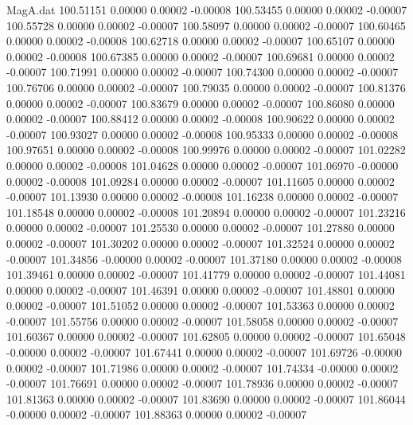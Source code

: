 \begin{filecontents}{MagA.dat}
 100.51151    0.00000    0.00002   -0.00008
 100.53455    0.00000    0.00002   -0.00007
 100.55728    0.00000    0.00002   -0.00007
 100.58097    0.00000    0.00002   -0.00007
 100.60465    0.00000    0.00002   -0.00008
 100.62718    0.00000    0.00002   -0.00007
 100.65107    0.00000    0.00002   -0.00008
 100.67385    0.00000    0.00002   -0.00007
 100.69681    0.00000    0.00002   -0.00007
 100.71991    0.00000    0.00002   -0.00007
 100.74300    0.00000    0.00002   -0.00007
 100.76706    0.00000    0.00002   -0.00007
 100.79035    0.00000    0.00002   -0.00007
 100.81376    0.00000    0.00002   -0.00007
 100.83679    0.00000    0.00002   -0.00007
 100.86080    0.00000    0.00002   -0.00007
 100.88412    0.00000    0.00002   -0.00008
 100.90622    0.00000    0.00002   -0.00007
 100.93027    0.00000    0.00002   -0.00008
 100.95333    0.00000    0.00002   -0.00008
 100.97651    0.00000    0.00002   -0.00008
 100.99976    0.00000    0.00002   -0.00007
 101.02282    0.00000    0.00002   -0.00008
 101.04628    0.00000    0.00002   -0.00007
 101.06970   -0.00000    0.00002   -0.00008
 101.09284    0.00000    0.00002   -0.00007
 101.11605    0.00000    0.00002   -0.00007
 101.13930    0.00000    0.00002   -0.00008
 101.16238    0.00000    0.00002   -0.00007
 101.18548    0.00000    0.00002   -0.00008
 101.20894    0.00000    0.00002   -0.00007
 101.23216    0.00000    0.00002   -0.00007
 101.25530    0.00000    0.00002   -0.00007
 101.27880    0.00000    0.00002   -0.00007
 101.30202    0.00000    0.00002   -0.00007
 101.32524    0.00000    0.00002   -0.00007
 101.34856   -0.00000    0.00002   -0.00007
 101.37180    0.00000    0.00002   -0.00008
 101.39461    0.00000    0.00002   -0.00007
 101.41779    0.00000    0.00002   -0.00007
 101.44081    0.00000    0.00002   -0.00007
 101.46391    0.00000    0.00002   -0.00007
 101.48801    0.00000    0.00002   -0.00007
 101.51052    0.00000    0.00002   -0.00007
 101.53363    0.00000    0.00002   -0.00007
 101.55756    0.00000    0.00002   -0.00007
 101.58058    0.00000    0.00002   -0.00007
 101.60367    0.00000    0.00002   -0.00007
 101.62805    0.00000    0.00002   -0.00007
 101.65048   -0.00000    0.00002   -0.00007
 101.67441    0.00000    0.00002   -0.00007
 101.69726   -0.00000    0.00002   -0.00007
 101.71986    0.00000    0.00002   -0.00007
 101.74334   -0.00000    0.00002   -0.00007
 101.76691    0.00000    0.00002   -0.00007
 101.78936    0.00000    0.00002   -0.00007
 101.81363    0.00000    0.00002   -0.00007
 101.83690    0.00000    0.00002   -0.00007
 101.86044   -0.00000    0.00002   -0.00007
 101.88363    0.00000    0.00002   -0.00007

\end{filecontents}
